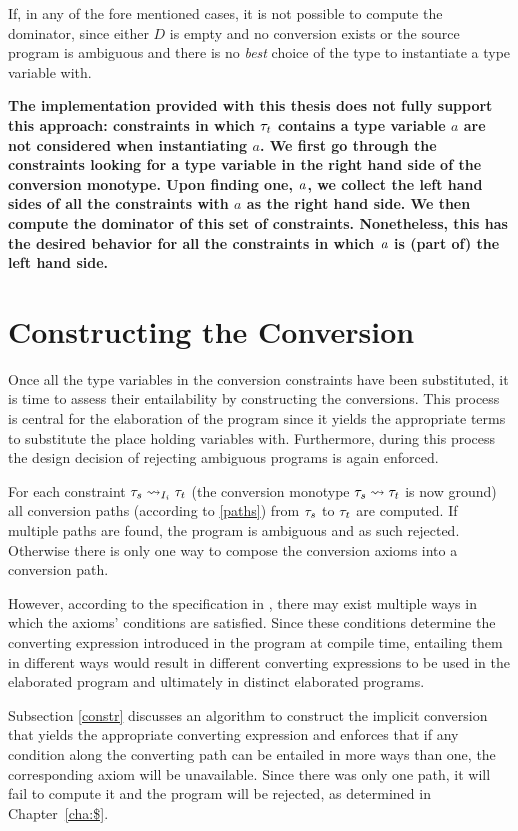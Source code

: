 If, in any of the fore mentioned cases, it is not possible to compute the dominator, since either $D$ is empty and no conversion exists or the source program is ambiguous and there is no \textit{best} choice of the type to instantiate a type variable with.

\textbf{The implementation provided with this thesis does not fully support this approach: constraints in which $\type_t$ contains a type variable $a$ are not considered when instantiating $a$. We first go through the constraints looking for a type variable in the right hand side of the conversion monotype. Upon finding one, $\tyVar$, we collect the left hand sides of all the constraints with $a$ as the right hand side. We then compute the dominator of this set of constraints. Nonetheless, this has the desired behavior for all the constraints in which $\tyVar$ is (part of) the left hand side.}

\section{Constructing the Conversion}
\label{constructing}
Once all the type variables in the conversion constraints have been substituted, it is time to assess their entailability by constructing the conversions. This process is central for the elaboration of the program since it yields the appropriate terms to substitute the place holding variables with. Furthermore, during this process the design decision of rejecting ambiguous programs is again enforced.

For each constraint $\convX{\imEnv_i}{\type_{s}}{\type_{t}}$ (the conversion monotype $\type_{s}\rightsquigarrow \type_{t}$ is now ground) all conversion paths (according to \ref{paths}) from $\type_{s}$ to $\type_{t}$ are computed. If multiple paths are found, the program is ambiguous and as such rejected. Otherwise there is only one way to compose the conversion axioms into a conversion path.

However, according to the specification in , there may exist multiple ways in which the axioms' conditions are satisfied. Since these conditions determine the converting expression introduced in the program at compile time, entailing them in different ways would result in different converting expressions to be used in the elaborated program and ultimately in distinct elaborated programs.

Subsection \ref{constr} discusses an algorithm to construct the implicit conversion that yields the appropriate converting expression and enforces that if any condition along the converting path can be entailed in more ways than one, the corresponding axiom will be unavailable. Since there was only one path, it will fail to compute it and the program will be rejected, as determined in Chapter~\ref{cha:$}.


